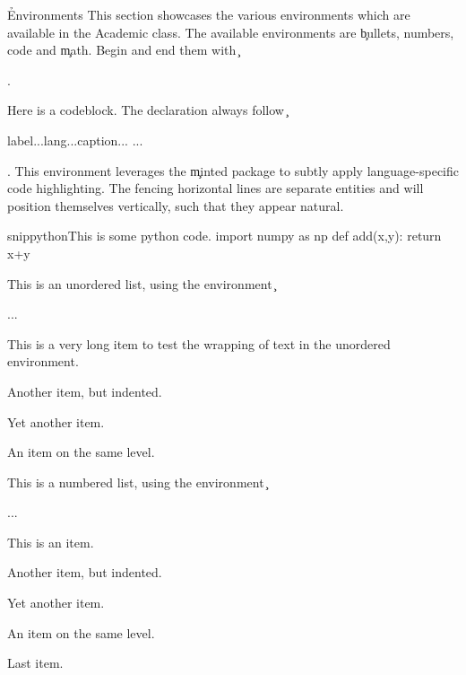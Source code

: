 \documentclass[twocolumn]{academic}
\begin{document}
\h{Environments}
This section showcases the various environments which are available in the Academic class. The available environments are \c{bullets, numbers, code} and \c{math}. Begin and end them with \c{\begin{}} and \c{\end{}}.

Here is a codeblock. The declaration always follow \c{\begin{code}{label...}{lang...}{caption...} ... \end{code}}. This environment leverages the \c{minted}\cite{minted} package to subtly apply language-specific code highlighting. The fencing horizontal lines are separate entities and will position themselves vertically, such that they appear natural.

\begin{code}{snip}{python}{This is some python code.}
    import numpy as np
    def add(x,y):
        return x+y
\end{code}

This is an unordered list, using the environment \c{\begin{bullets}...\end{bullets}}
\begin{bullets}
    \item This is a very long item to test the wrapping of text in the unordered environment.
    \begin{bullets}
        \item Another item, but indented.
        \begin{bullets}
            \item Yet another item.
            \item An item on the same level.
        \end{bullets}
    \end{bullets}
\end{bullets}

This is a numbered list, using the environment \c{\begin{numbers}...\end{numbers}}
\begin{numbers}
    \item This is an item.
    \begin{numbers}
        \item Another item, but indented.
        \begin{numbers}
            \item Yet another item.
            \item An item on the same level.
        \end{numbers}
    \end{numbers}
    \item Last item.
\end{numbers}
\end{document}
